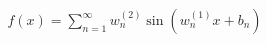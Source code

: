 \documentclass[preview]{standalone}
\begin{document}
\begin{align*}
f(x) = \sum_{n=1}^{\infty} w_n^{(2)} \sin(w_n^{(1)} x + b_n)
\end{align*}
\end{document}
